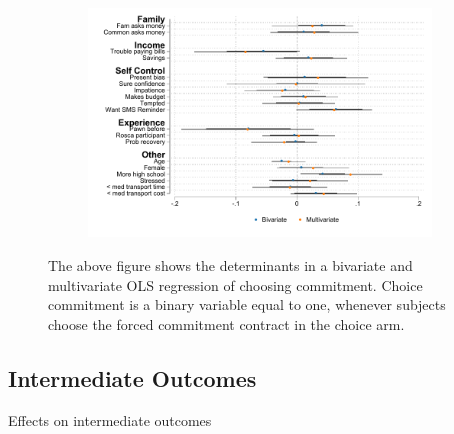 \begin{appendix}
\begin{figure}[H]
    \caption{Determinants of choice.}
    \begin{center}
    \begin{subfigure}{0.65\textwidth}
        \centering
        \includegraphics[width=\textwidth]{Figuras/determinants_choose_commitment.pdf}
    \end{subfigure}
    \end{center}
\footnotesize{The above figure shows the determinants in a bivariate and multivariate OLS regression of choosing commitment. Choice commitment is a binary variable equal to one, whenever subjects choose the forced commitment contract in the choice arm. }
    \label{determinants_choose}
\end{figure}


\subsection{Intermediate Outcomes}

\begin{landscape}
    
\begin{table}[!h]
\caption{Effects on intermediate outcomes}
\label{mechanisms}
\begin{center}

\scriptsize{}


\end{center}
\end{table}
\end{landscape}
\end{appendix}
